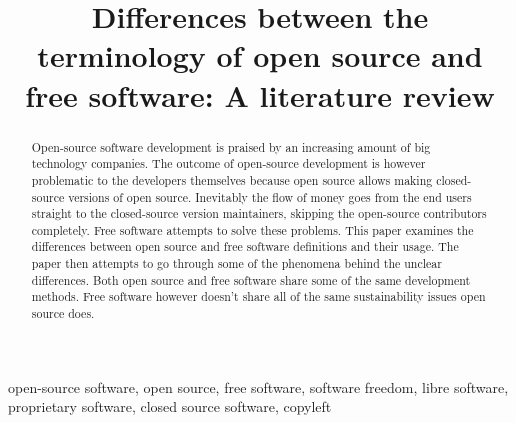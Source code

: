 \documentclass[conference]{IEEEtran}
\begin{document}
\title{Differences between the terminology of open source and free software: A literature review}

\author{
}

\maketitle

\begin{abstract}
Open-source software development is praised by an increasing amount of big technology companies. The outcome of open-source development is however problematic to the developers themselves because open source allows making closed-source versions of open source. Inevitably the flow of money goes from the end users straight to the closed-source version maintainers, skipping the open-source contributors completely. Free software attempts to solve these problems. This paper examines the differences between open source and free software definitions and their usage. The paper then attempts to go through some of the phenomena behind the unclear differences. Both open source and free software share some of the same development methods. Free software however doesn't share all of the same sustainability issues open source does.
\end{abstract}

\begin{IEEEkeywords}
	open-source software, open source, free software, software freedom, libre software, proprietary software, closed source software, copyleft
\end{IEEEkeywords}
\end{document}

